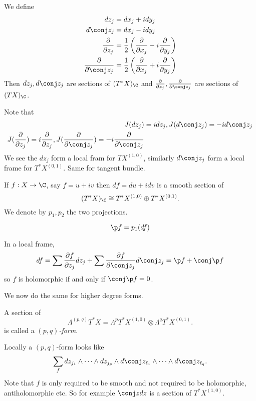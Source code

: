 \documentclass[a4paper]{article}
\newcommand{\w}{\wedge} %
\begin{document}
\begin{definition}
  We define
  \begin{align*}
    dz_j &= dx_j + idy_j \\
    d\conj z_j &= dx_j - idy_j \\
    \frac{\partial  }{\partial z_j} &= \frac{1}{2} \left( \frac{\partial  }{\partial x_j} - i \frac{\partial  }{\partial y_j} \right) \\
    \frac{\partial  }{\partial \conj z_j} &= \frac{1}{2} \left( \frac{\partial  }{\partial x_j} + i \frac{\partial  }{\partial y_j} \right)
  \end{align*}
  Then \(dz_j, d\conj z_j\) are sections of \((T^*X)_\C\) and \(\frac{\partial  }{\partial z_j}, \frac{\partial  }{\partial \conj z_j}\) are sections of \((TX)_\C\).
\end{definition}

Note that
\begin{align*}
  J(dz_j) &= i dz_j, J(d\conj z_j) = -i d\conj z_j \\
  J(\frac{\partial  }{\partial z_j}) = i \frac{\partial  }{\partial z_j}, J(\frac{\partial  }{\partial \conj z_j}) = -i \frac{\partial  }{\partial \conj z_j}
\end{align*}
We see the \(dz_j\) form a local fram for \(TX^{(1, 0)}\), similarly \(d\conj z_j\) form a local frame for \(T^*X^{(0, 1)}\). Same for tangent bundle.

If \(f: X \to \C\), say \(f = u + iv\) then \(df = du + idv\) is a smooth section of
\[
  (T^*X)_\C \cong T^*X^{(1, 0)} \oplus T^*X^{(0, 1)}.
\]
We denote by \(p_1, p_2\) the two projections.

\begin{definition}
  \[
    \p f = p_1 (df)
  \]
\end{definition}

In a local frame,
\[
  df
  = \sum \frac{\partial f}{\partial z_j} dz_j + \sum \frac{\partial f}{\partial \conj z_j} d\conj z_j
  = \p f + \conj \p f
\]
so \(f\) is holomorphic if and only if \(\conj \p f = 0\).

We now do the same for higher degree forms.

\begin{definition}[form]
  A section of
  \[
    \Lambda^{(p, q)}T^*X = \Lambda^pT^*X^{(1, 0)} \otimes \Lambda^qT^*X^{(0, 1)}.
  \]
  is called a \emph{\((p, q)\)-form}.
\end{definition}

Locally a \((p, q)\)-form looks like
\[
  \sum_f dz_{j_1} \w \dots \w dz_{j_p} \w d\conj z_{\ell_1} \w \dots \w d\conj z_{\ell_q}.
\]
Note that \(f\) is only required to be smooth and not required to be holomorphic, antiholomorphic etc. So for example \(\conj z dz\) is a section of \(T^*X^{(1, 0)}\).
\end{document}
